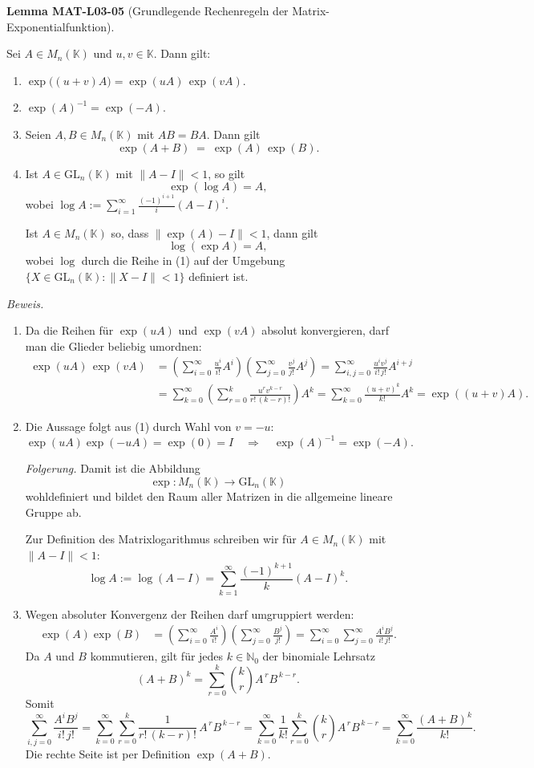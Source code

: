 \documentclass[10pt, letterpaper]{article}
\newcommand{\CustomHeading}[3]{%
  \par\medskip\noindent%
  \textbf{#1 #2} \textnormal{(#3)}.\enskip%
}
\newenvironment{LEM}[2]{\begin{unitbox}\CustomHeading{Lemma}{#1}{#2}}{\end{unitbox}}
\begin{document}
\begin{LEM}{MAT-L03-05}{Grundlegende Rechenregeln der Matrix-Exponentialfunktion}
Sei $A \in M_n(\mathbb{K})$ und $u,v \in \mathbb{K}$. Dann gilt:
\begin{enumerate}
\item $\exp\big((u+v)A\big) = \exp(uA)\,\exp(vA)$.
\item $\exp(A)^{-1} = \exp(-A)$.
\item Seien $A,B\in M_n(\mathbb{K})$ mit $AB=BA$. Dann gilt
\[
\exp(A+B)\;=\;\exp(A)\,\exp(B).
\]
\item Ist $A\in \mathrm{GL}_n(\mathbb{K})$ mit $\|A-I\|<1$, so gilt
\[
\exp(\log A)=A,
\]
wobei $\log A:=\sum_{i=1}^{\infty}\frac{(-1)^{i+1}}{i}(A-I)^i$.

Ist $A\in M_n(\mathbb{K})$ so, dass $\|\exp(A)-I\|<1$, dann gilt
\[
\log(\exp A)=A,
\]
wobei $\log$ durch die Reihe in (1) auf der Umgebung $\{X\in \mathrm{GL}_n(\mathbb{K}) : \|X-I\|<1\}$ definiert ist.
\end{enumerate}

\textit{Beweis.}
\begin{enumerate}
\item
Da die Reihen für $\exp(uA)$ und $\exp(vA)$ absolut konvergieren, darf man die Glieder beliebig umordnen:
\[
\begin{aligned}
\exp(uA)\,\exp(vA)
&= \left(\sum_{i=0}^{\infty} \frac{u^i}{i!} A^i \right)
   \left(\sum_{j=0}^{\infty} \frac{v^j}{j!} A^j \right)
= \sum_{i,j=0}^{\infty} \frac{u^i v^j}{i!\,j!} A^{i+j} \\
&= \sum_{k=0}^{\infty} \left( \sum_{r=0}^k \frac{u^r v^{k-r}}{r!\,(k-r)!} \right) A^k
= \sum_{k=0}^{\infty} \frac{(u+v)^k}{k!} A^k
= \exp((u+v)A).
\end{aligned}
\]
\item
Die Aussage folgt aus (1) durch Wahl von $v=-u$:
\[
\exp(uA)\exp(-uA)=\exp(0)=I
\quad \Rightarrow \quad
\exp(A)^{-1} = \exp(-A).
\]

\textit{Folgerung.}
Damit ist die Abbildung
\[
\exp : M_n(\mathbb{K}) \longrightarrow \mathrm{GL}_n(\mathbb{K})
\]
wohldefiniert und bildet den Raum aller Matrizen in die allgemeine lineare Gruppe ab.

Zur Definition des Matrixlogarithmus schreiben wir für $A \in M_n(\mathbb{K})$ mit $\|A - I\| < 1$:
\[
\log A := \log(A - I) = \sum_{k=1}^{\infty} \frac{(-1)^{k+1}}{k} (A - I)^k.
\]

\item Wegen absoluter Konvergenz der Reihen darf umgruppiert werden:
\[
\begin{aligned}
\exp(A)\exp(B)
&=\left(\sum_{i=0}^{\infty}\frac{A^i}{i!}\right)
  \left(\sum_{j=0}^{\infty}\frac{B^j}{j!}\right)
= \sum_{i=0}^{\infty}\sum_{j=0}^{\infty}\frac{A^i B^j}{i!\,j!}.
\end{aligned}
\]
Da $A$ und $B$ kommutieren, gilt für jedes $k\in\mathbb{N}_0$ der binomiale Lehrsatz
\[
(A+B)^k=\sum_{r=0}^{k}\binom{k}{r}A^{\,r}B^{\,k-r}.
\]
Somit
\[
\sum_{i,j=0}^{\infty}\frac{A^i B^j}{i!\,j!}
=\sum_{k=0}^{\infty}\sum_{r=0}^{k}\frac{1}{r!\,(k-r)!}\,A^{\,r}B^{\,k-r}
=\sum_{k=0}^{\infty}\frac{1}{k!}\sum_{r=0}^{k}\binom{k}{r}A^{\,r}B^{\,k-r}
=\sum_{k=0}^{\infty}\frac{(A+B)^k}{k!}.
\]
Die rechte Seite ist per Definition $\exp(A+B)$.



\end{enumerate}
\end{LEM}
\end{document}
